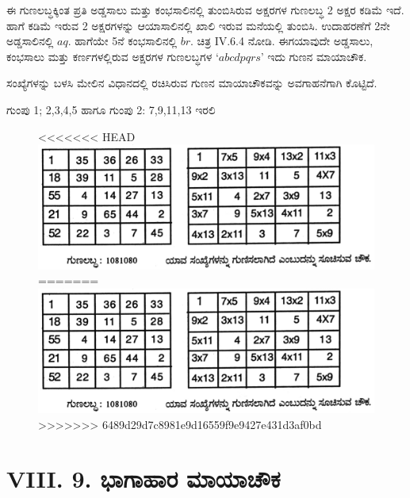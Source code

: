 \begin{itemize}
	ಈ ಗುಣಲಬ್ಧಕ್ಕಿಂತ ಪ್ರತಿ ಅಡ್ಡಸಾಲು ಮತ್ತು ಕಂಭಸಾಲಿನಲ್ಲಿ ತುಂಬಿಸಿರುವ ಅಕ್ಷರಗಳ ಗುಣಲಬ್ಧ 2 ಅಕ್ಷರ ಕಡಿಮೆ ಇದೆ. ಹಾಗೆ ಕಡಿಮೆ ಇರುವ 2 ಅಕ್ಷರಗಳನ್ನು ಆಯಾ\-ಸಾಲಿನಲ್ಲಿ ಖಾಲಿ ಇರುವ ಮನೆಯಲ್ಲಿ ತುಂಬಿಸಿ. ಉದಾಹರಣೆಗೆ 2ನೇ ಅಡ್ಡಸಾಲಿ\-ನಲ್ಲಿ $aq$. ಹಾಗೆಯೇ 5ನೆ ಕಂಭಸಾಲಿನಲ್ಲಿ $br$. ಚಿತ್ರ IV.6.4 ನೋಡಿ. ಈಗ\break ಯಾವುದೇ ಅಡ್ಡಸಾಲು, ಕಂಭಸಾಲು ಮತ್ತು ಕರ್ಣಗಳಲ್ಲಿರುವ ಅಕ್ಷರಗಳ ಗುಣಲಬ್ಧಗಳ `$abcdpqrs$’ ಇದು ಗುಣನ ಮಾಯಾಚೌಕ.

	ಸಂಖ್ಯೆಗಳನ್ನು ಬಳಸಿ ಮೇಲಿನ ವಿಧಾನದಲ್ಲಿ ರಚಿಸಿರುವ ಗುಣನ ಮಾಯಾಚೌಕವನ್ನು ಅವಗಾಹನೆಗಾಗಿ ಕೊಟ್ಟಿದೆ.

	ಗುಂಪು 1; 2,3,4,5 ಹಾಗೂ ಗುಂಪು 2: 7,9,11,13 ಇರಲಿ
	\begin{figure}[H]
<<<<<<< HEAD
	\includegraphics{src/figures/chap7/fig7-30.jpg}
=======
	\includegraphics[scale=0.75]{src/figures/chap7/fig7.30.jpg}
>>>>>>> 6489d29d7c8981e9d16559f9e9427e431d3af0bd
	\end{figure}
\end{itemize}

\section*{VIII. 9. ಭಾಗಾಹಾರ ಮಾಯಾಚೌಕ}

